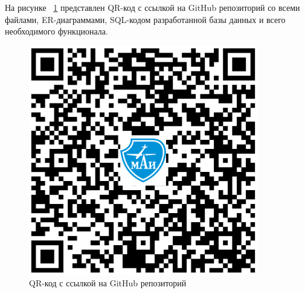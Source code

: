 
На рисунке ~\ref{fig:a1} представлен QR-код с ссылкой на GitHub репозиторий со всеми файлами, ER-диаграммами, SQL-кодом разработанной базы данных и всего необходимого функционала.

\begin{figure}
    \includegraphics[width=10cm]{inc/QR-code}
    \caption{QR-код с ссылкой на GitHub репозиторий}
    \label{fig:a1}
\end{figure}
